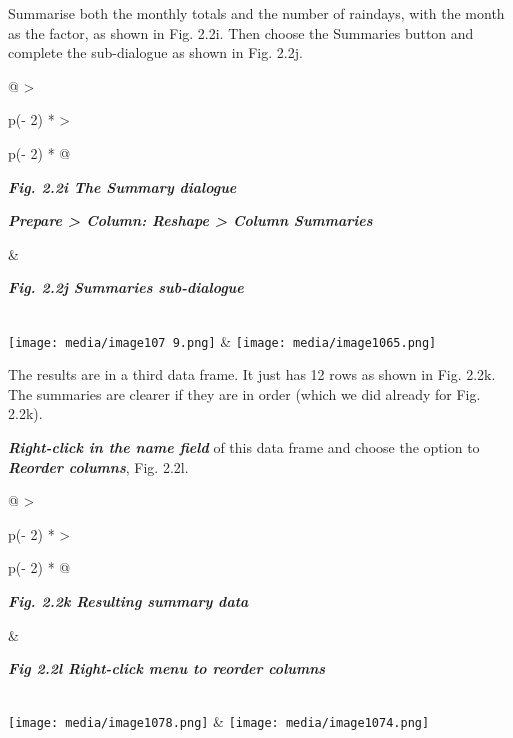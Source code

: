 \documentclass[
  letterpaper,
  DIV=11,
  numbers=noendperiod]{scrreprt}
\begin{document}
Summarise both the monthly totals and the number of raindays, with the
month as the factor, as shown in Fig. 2.2i. Then choose the Summaries
button and complete the sub-dialogue as shown in Fig. 2.2j.

\begin{longtable}[]{@{}
  >{\raggedright\arraybackslash}p{(\columnwidth - 2\tabcolsep) * }
  >{\raggedright\arraybackslash}p{(\columnwidth - 2\tabcolsep) * }@{}}
\toprule\noalign{}
\begin{minipage}[b]{\linewidth}\raggedright
\textbf{\emph{Fig. 2.2i The Summary dialogue}}

\textbf{\emph{Prepare \textgreater{} Column: Reshape \textgreater{}
Column Summaries}}
\end{minipage} & \begin{minipage}[b]{\linewidth}\raggedright
\textbf{\emph{Fig. 2.2j Summaries sub-dialogue}}
\end{minipage} \\
\midrule\noalign{}
\endhead
\bottomrule\noalign{}
\endlastfoot
\texttt{[image: media/image107 9.png]}
&
\texttt{[image: media/image1065.png]} \\
\end{longtable}

The results are in a third data frame. It just has 12 rows as shown in
Fig. 2.2k. The summaries are clearer if they are in order (which we did
already for Fig. 2.2k).

\textbf{\emph{Right-click in the name field}} of this data frame and
choose the option to \textbf{\emph{Reorder columns}}, Fig. 2.2l.

\begin{longtable}[]{@{}
  >{\raggedright\arraybackslash}p{(\columnwidth - 2\tabcolsep) * }
  >{\raggedright\arraybackslash}p{(\columnwidth - 2\tabcolsep) * }@{}}
\toprule\noalign{}
\begin{minipage}[b]{\linewidth}\raggedright
\textbf{\emph{Fig. 2.2k Resulting summary data}}
\end{minipage} & \begin{minipage}[b]{\linewidth}\raggedright
\textbf{\emph{Fig 2.2l Right-click menu to reorder columns}}
\end{minipage} \\
\midrule\noalign{}
\endhead
\bottomrule\noalign{}
\endlastfoot
\texttt{[image: media/image1078.png]}
&
\texttt{[image: media/image1074.png]} \\
\end{longtable}
\end{document}
